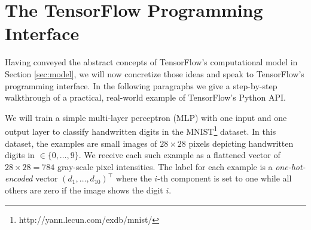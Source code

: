 \section{The TensorFlow Programming Interface}\label{sec:code}

Having conveyed the abstract concepts of TensorFlow's computational model in
Section \ref{sec:model}, we will now concretize those ideas and speak to
TensorFlow's programming interface. In the following paragraphs we give a
step-by-step walkthrough of a practical, real-world example of TensorFlow's
Python API.

We will train a simple multi-layer perceptron (MLP) with one input and one
output layer to classify handwritten digits in the
MNIST\footnote{http://yann.lecun.com/exdb/mnist/} dataset. In this dataset, the
examples are small images of $28 \times 28$ pixels depicting handwritten digits
in $\in \{0, \dots, 9\}$. We receive each such example as a flattened vector of
$28 \times 28 = 784$ gray-scale pixel intensities. The label for each example is
a \emph{one-hot-encoded} vector $(d_1, \dots, d_{10})^\top$ where the $i$-th
component is set to one while all others are zero if the image shows the digit
$i$.

